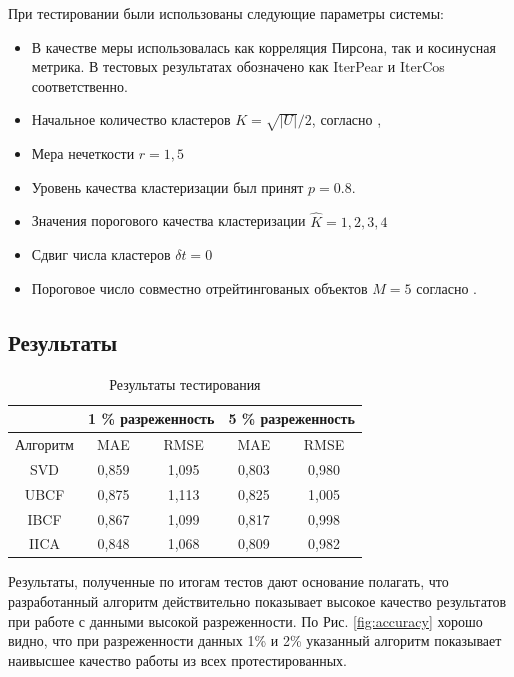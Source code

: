 \documentclass[a4paper, 12pt]{article} %
\begin{document}
При тестировании были использованы следующие параметры системы: 
\begin{itemize}
\item В качестве меры использовалась как корреляция Пирсона, так и косинусная метрика. В тестовых результатах обозначено как IterPear и IterCos соответственно.
\item Начальное количество кластеров $K = \sqrt{|U|} / 2$, согласно \cite{bees}, 
\item Мера нечеткости $r = 1,5$
\item Уровень качества кластеризации был принят $p = 0.8$.
\item Значения порогового качества кластеризации $\hat{K} = 1, 2, 3, 4$ 
\item Сдвиг числа кластеров $\delta t = 0$
\item Пороговое число совместно отрейтингованых объектов $M = 5$ согласно \cite{itercf}.
\end{itemize}

\subsection{Результаты}



\begin{table}[h!]
	\begin{center}
		\begin{tabular}{|c|c|c|c|c|}
		\hline
		 & \multicolumn{2}{|c|}{ 1 \% разреженность} & \multicolumn{2}{|c|}{ 5 \% разреженность} \\
		 \hline
		 Алгоритм & MAE & RMSE & MAE & RMSE \\
		 \hline
		 SVD & 0,859 & 1,095 & 0,803 & 0,980 \\
		 \hline
		 UBCF & 0,875 & 1,113 & 0,825  & 1,005\\
		 \hline
		 IBCF & 0,867 & 1,099 & 0,817 &  0,998 \\ 
		 \hline
		 IICA & 0,848 & 1,068& 0,809 & 0,982 \\
		 \hline
		 
		\end{tabular}
		
	\end{center}
		\caption{Результаты тестирования}
		\label{tab:res}
	\end{table}
	
	Результаты, полученные по итогам тестов дают основание полагать, что разработанный алгоритм действительно показывает высокое качество результатов при работе с данными высокой разреженности. По Рис. \ref{fig:accuracy} хорошо видно, что при разреженности данных 1\% и 2\% указанный алгоритм показывает наивысшее качество работы из всех протестированных.
\end{document}
